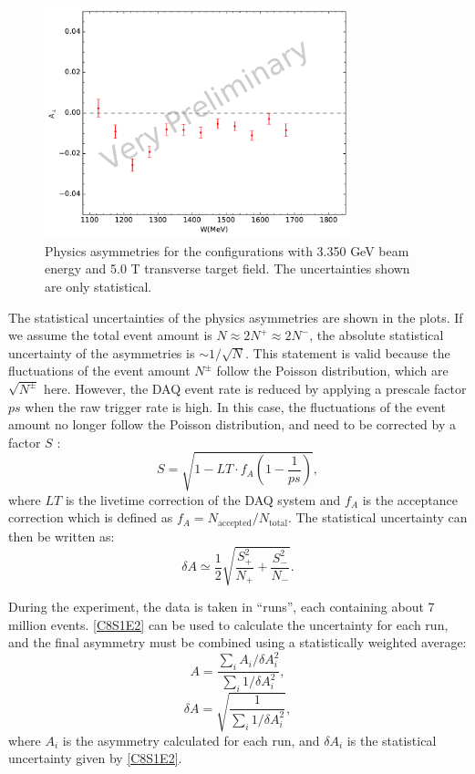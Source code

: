 \begin{figure}[tb!]
  \centering
  \includegraphics[width=0.79\textwidth]{figs/asymmetry-33505090.pdf}
  \caption[Physics asymmetries with $E=3.350$ GeV and $B=5.0$ T.]{Physics asymmetries for the configurations with 3.350 GeV beam energy and 5.0 T transverse target field. The uncertainties shown are only statistical. \label{C8S1F4}}
\end{figure}

The statistical uncertainties of the physics asymmetries are shown in the plots. If we assume the total event amount is $N\approx2N^+\approx2N^-$, the absolute statistical uncertainty of the asymmetries is $\sim1/\sqrt{N}$. This statement is valid because the fluctuations of the event amount $N^{\pm}$ follow the Poisson distribution, which are $\sqrt{N^{\pm}}$ here. However, the DAQ event rate is reduced by applying a prescale factor $ps$ when the raw trigger rate is high. In this case, the fluctuations of the event amount no longer follow the Poisson distribution, and need to be corrected by a factor $S$ \cite{Qiang2007}:
\begin{equation} \label{C8S1E1}
S = \sqrt{1-LT\cdot f_A(1-\frac{1}{ps})},
\end{equation}
where $LT$ is the livetime correction of the DAQ system and $f_A$ is the acceptance correction which is defined as $f_A=N_{\mathrm{accepted}}/N_{\mathrm{total}}$. The statistical uncertainty can then be written as:
\begin{equation} \label{C8S1E2}
\delta A \simeq \frac{1}{2}\sqrt{\frac{S_+^2}{N_+}+\frac{S_-^2}{N_-}}.
\end{equation}

During the experiment, the data is taken in ``runs'', each containing about 7 million events. \cref{C8S1E2} can be used to calculate the uncertainty for each run, and the final asymmetry must be combined using a statistically weighted average:
\begin{equation} \label{C8S1E3}
A = \frac{\sum_iA_i/\delta A_i^2}{\sum_i1/\delta A_i^2},
\end{equation}
\begin{equation} \label{C8S1E4}
\delta A = \sqrt{\frac{1}{\sum_i1/\delta A_i^2}},
\end{equation}
where $A_i$ is the asymmetry calculated for each run, and $\delta A_i$ is the statistical uncertainty given by \cref{C8S1E2}.

